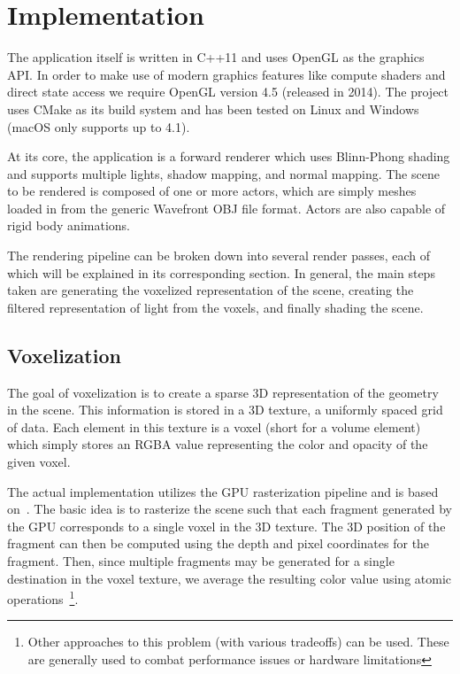 \chapter{Implementation}

The application itself is written in C++11 and uses OpenGL as the graphics API. In order to make use of modern graphics features like compute shaders and direct state access we require OpenGL version 4.5 (released in 2014). The project uses CMake as its build system and has been tested on Linux and Windows (macOS only supports up to 4.1).

At its core, the application is a forward renderer which uses Blinn-Phong shading and supports multiple lights, shadow mapping, and normal mapping. The scene to be rendered is composed of one or more actors, which are simply meshes loaded in from the generic Wavefront OBJ file format. Actors are also capable of rigid body animations.

The rendering pipeline can be broken down into several render passes, each of which will be explained in its corresponding section. In general, the main steps taken are generating the voxelized representation of the scene, creating the filtered representation of light from the voxels, and finally shading the scene.

\section{Voxelization}
The goal of voxelization is to create a sparse 3D representation of the geometry in the scene. This information is stored in a 3D texture, a uniformly spaced grid of data. Each element in this texture is a voxel (short for a volume element) which simply stores an RGBA value representing the color and opacity of the given voxel.

The actual implementation utilizes the GPU rasterization pipeline and is based on~\cite{crassin12}. The basic idea is to rasterize the scene such that each fragment generated by the GPU corresponds to a single voxel in the 3D texture. The 3D position of the fragment can then be computed using the depth and pixel coordinates for the fragment. Then, since multiple fragments may be generated for a single destination in the voxel texture, we average the resulting color value using atomic operations~\footnote{Other approaches to this problem (with various tradeoffs) can be used. These are generally used to combat performance issues or hardware limitations}.

